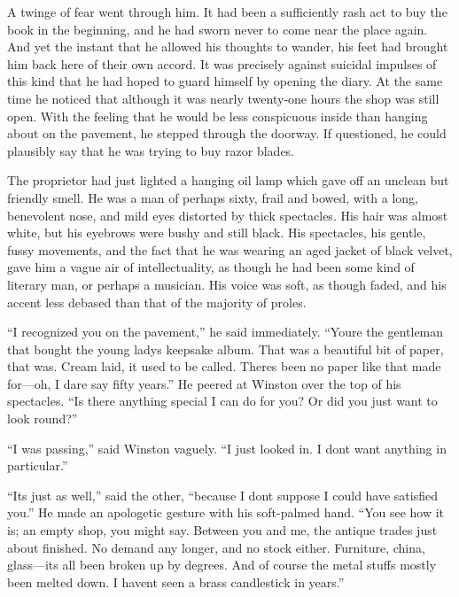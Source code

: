A twinge of fear went through him. It had been a sufficiently rash act
to buy the book in the beginning, and he had sworn never to come near
the place again. And yet the instant that he allowed his thoughts to
wander, his feet had brought him back here of their own accord. It was
precisely against suicidal impulses of this kind that he had hoped to
guard himself by opening the diary. At the same time he noticed that
although it was nearly twenty-one hours the shop was still open. With
the feeling that he would be less conspicuous inside than hanging about
on the pavement, he stepped through the doorway. If questioned, he could
plausibly say that he was trying to buy razor blades.

The proprietor had just lighted a hanging oil lamp which gave off an
unclean but friendly smell. He was a man of perhaps sixty, frail and
bowed, with a long, benevolent nose, and mild eyes distorted by thick
spectacles. His hair was almost white, but his eyebrows were bushy and
still black. His spectacles, his gentle, fussy movements, and the fact
that he was wearing an aged jacket of black velvet, gave him a vague air
of intellectuality, as though he had been some kind of literary man, or
perhaps a musician. His voice was soft, as though faded, and his accent
less debased than that of the majority of proles.

``I recognized you on the pavement,'' he said immediately.
``You\textquotesingle re the gentleman that bought the young
lady\textquotesingle s keepsake album. That was a beautiful bit of
paper, that was. Cream laid, it used to be called.
There\textquotesingle s been no paper like that made for---oh, I dare
say fifty years.'' He peered at Winston over the top of his spectacles.
``Is there anything special I can do for you? Or did you just want to
look round?''

``I was passing,'' said Winston vaguely. ``I just looked in. I
don\textquotesingle t want anything in particular.''

``It\textquotesingle s just as well,'' said the other, ``because I
don\textquotesingle t suppose I could have satisfied you.'' He made an
apologetic gesture with his soft-palmed hand. ``You see how it is; an
empty shop, you might say. Between you and me, the antique
trade\textquotesingle s just about finished. No demand any longer, and
no stock either. Furniture, china, glass---it\textquotesingle s all been
broken up by degrees. And of course the metal stuff\textquotesingle s
mostly been melted down. I haven\textquotesingle t seen a brass
candlestick in years.''

